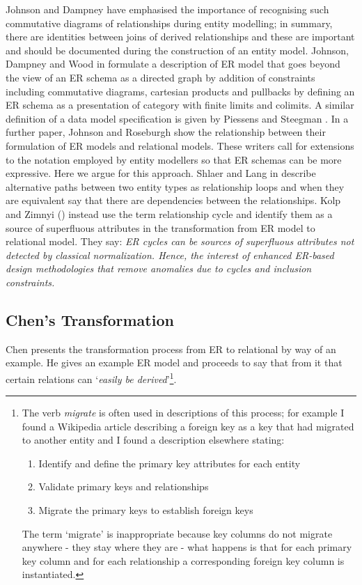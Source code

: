 Johnson and Dampney \cite{Johnson93} have emphasised the 
importance of recognising such commutative diagrams of 
relationships during entity modelling; 
in summary, there are identities between joins of derived 
relationships and these are important
and should be documented during the construction of an entity model. 
Johnson, Dampney and Wood in \cite{Johnson2002ERA} formulate a description of 
ER model that goes beyond the view of an ER schema as a directed graph 
by addition of constraints including commutative diagrams, cartesian products and 
pullbacks by defining an ER schema as a presentation of category with 
finite limits and colimits.  
A similar definition of a data model specification is given by Piessens and Steegman \cite{piessens1995}.
In a further paper, Johnson and Roseburgh  \cite{johnson2002REL} show the 
relationship between their formulation of ER models and relational models. 
These writers call for extensions to the notation employed by entity modellers so that ER schemas can be more expressive. Here we argue for this approach.  
Shlaer and Lang in \cite{Shlaer96} describe alternative paths between two entity types as relationship loops and when they are equivalent say that there are dependencies between the relationships.  
Kolp and Zimnyi (\cite{Kolp1995}) instead use the term relationship cycle and identify them as a source of 
superfluous attributes in the transformation from ER model to relational model. They say: \textit{ER cycles can be sources of 
superfluous attributes not detected by classical normalization. Hence, the interest of enhanced ER-based design methodologies that remove anomalies due to cycles and inclusion constraints.}


\subsection{Chen's Transformation}
\label{ChensTransformation}

Chen presents the transformation process from ER to relational by way of an example. 
He gives an example ER model and proceeds to say that from it that certain relations can `\textit{easily be derived}'\footnote{The verb \textit{migrate} is often used in descriptions of this process; for example I found a Wikipedia article describing a foreign key as a key that had migrated to another entity and I found a description elsewhere stating:
\begin{enumerate}
\item {Identify and define the primary key attributes for each entity}
\item {Validate primary keys and relationships}
\item {Migrate the primary keys to establish foreign keys}
\end{enumerate} The term `migrate' is inappropriate because key columns do not migrate anywhere - they stay where they are - what happens is that for each primary key column and for each relationship a corresponding foreign key column is instantiated.
}. 

